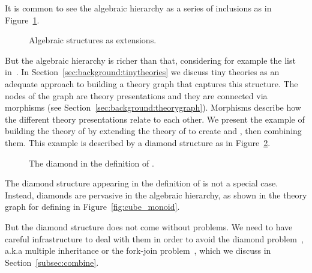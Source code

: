 It is common to see the algebraic hierarchy as a series of inclusions as in Figure~\ref{fig:flatExtensions}. 
\begin{figure}
\caption{Algebraic structures as extensions.}
\label{fig:flatExtensions}
\end{figure}  
But the algebraic hierarchy is richer than that, considering for example the list in~\cite{jipsen}. 
In Section~\ref{sec:background:tinytheories} we discuss tiny theories as an adequate approach to building a theory graph that captures this structure. The nodes of the graph are theory presentations and they are connected via morphisms (see Section~\ref{sec:background:theorygraph}). Morphisms describe how the different theory presentations relate to each other. 
We present the example of building the theory of  by extending the theory of  to create  and , then combining them. This example is described by a diamond structure as in Figure~\ref{fig:unitalDiamond}. 
\begin{figure}
\caption{The diamond in the definition of .}
\label{fig:unitalDiamond}
\end{figure}
The diamond structure appearing in the definition of  is not a special case. Instead, diamonds are pervasive in the algebraic hierarchy, as shown in the theory graph for defining  in Figure~\ref{fig:cube_monoid}. 

But the diamond structure does not come without problems. We need to have careful infrastructure to deal with them in order to avoid the diamond problem~\cite{jigsaw1992,traits2006,diamonds2011}, a.k.a multiple inheritance or the fork-join problem~\cite{sakkinen1989disciplined}, which we discuss in Section~\ref{subsec:combine}.


